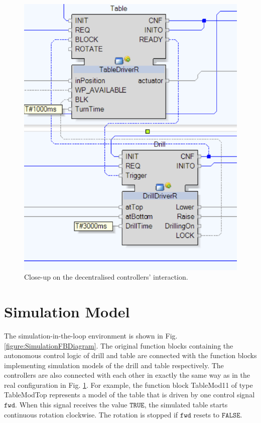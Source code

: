 \documentclass[conference]{IEEEtran}
\newcommand \com[1] {\ensuremath{\mathtt{#1}}}
\begin{document}
\begin{figure}
    \centering
    \includegraphics[scale = 0.20]{images/DT_REAL_FB_CONTROLLERS.png}
    \caption{Close-up on the decentralised controllers' interaction.}
    \label{figure:RealFBControllers}
\end{figure}

\section{Simulation Model}

The simulation-in-the-loop environment is shown in Fig. \ref{figure:SimulationFBDiagram}.  The original  function blocks containing the autonomous control logic of drill and table are connected with the function blocks implementing simulation models of the drill and table respectively. The controllers are also connected with each other in exactly the same way as in the real configuration in Fig. \ref{figure:RealFBControllers}. 
For example, the function block TableMod11 of type TableModTop represents a model of the table that is driven by one control signal \com{fwd}. When this signal receives the value \com{TRUE}, the simulated table starts continuous rotation clockwise. The rotation is stopped if \com{fwd} resets to \com{FALSE}.
\end{document}
